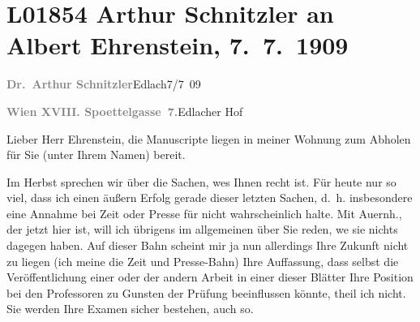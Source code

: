 

\section[Arthur Schnitzler an Albert Ehrenstein, 7. 7. 1909]{L01854 Arthur Schnitzler an Albert Ehrenstein, 7. 7. 1909}
\nopagebreak{}
\rehead{ }\normalsize\beginnumbering{}
\toendnotes[C]{\smallbreak\pagebreak[2]}
\pstart
           {\pb}\textcolor{gray}{\textbf{Dr. Arthur Schnitzler}}\hfill Edlach7/7 09\pend
           
\pstart
           \textcolor{gray}{\textbf{Wien XVIII. Spoettelgasse 7.}}\hfill Edlacher Hof\pend
           
\pstart{}Lieber Herr Ehrenstein,\pend\vspace{0.5em}
\pstart
           die Manuscripte liegen in meiner Wohnung zum Abholen für Sie (unter Ihrem Namen)
               bereit.\pend
           
\pstart
           Im Herbst sprechen wir über die Sachen, we{\geminationn}s Ihnen recht
               ist. Für heute nur so viel, {\pb}dass ich einen äußern Erfolg gerade
               dieser letzten Sachen, d. h. insbesondere eine Annahme bei Zeit oder Presse für nicht
               wahrscheinlich halte. Mit Auernh., der jetzt
               hier ist, will ich übrigens im allgemeinen über Sie reden, we{\geminationn} sie nichts dagegen haben. Auf dieser Bahn scheint mir
               ja nun {\pb}allerdings Ihre Zukunft nicht zu liegen (ich meine die
                  Zeit und Presse-Bahn) Ihre Auffassung, dass \introOben{}selbst\introOben{} die
               Veröffentlichung einer oder der andern Arbeit in einer dieser Blätter Ihre Position
               bei den Professoren zu Gunsten der Prüfung beeinflussen könnte, theil ich nicht. Sie
               werden Ihre {\pb}Examen sicher bestehen, auch so.\pend
           
